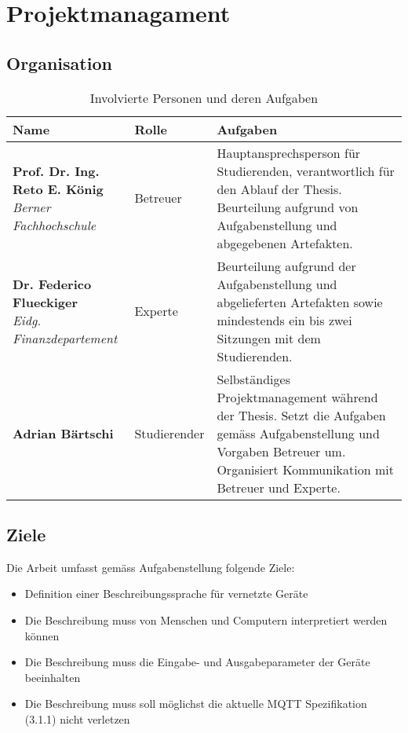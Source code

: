 \chapter{Projektmanagament}
\label{chap:projectmanagement}

\section{Organisation}

\begin{table}[H]
\begin{tabularx}{\textwidth}{|l|l|X|}

 \hline \rowcolor{lightgray}
 {\bf Name } & {\bf Rolle } & {\bf Aufgaben} \\  \hline
  \parbox[t]{5cm}{\textbf{Prof. Dr. Ing. Reto E. König} \\ \textit{Berner Fachhochschule}}  &   Betreuer  &
  Hauptansprechsperson für Studierenden, verantwortlich für den Ablauf der Thesis. Beurteilung aufgrund von Aufgabenstellung und abgegebenen Artefakten.   \\
 \hline
  \parbox[t]{5cm}{\textbf{Dr. Federico Flueckiger} \\ \textit{Eidg.  Finanzdepartement}} &   Experte     &
  Beurteilung aufgrund der Aufgabenstellung und abgelieferten Artefakten sowie mindestends ein bis zwei Sitzungen mit dem Studierenden. \\ 
\hline
 \textbf{Adrian Bärtschi}                &   Studierender   &     
 Selbständiges Projektmanagement während der Thesis. Setzt die Aufgaben gemäss Aufgabenstellung und Vorgaben Betreuer um. Organisiert Kommunikation mit Betreuer und Experte.   \\
 \hline


\end{tabularx}
\caption{Involvierte Personen und deren Aufgaben}
\end{table}


\section{Ziele}
Die Arbeit umfasst gemäss Aufgabenstellung folgende Ziele:
\begin{itemize}
    \item Definition einer Beschreibungssprache für vernetzte Geräte
    \item Die Beschreibung muss von Menschen und Computern interpretiert werden können
    \item Die Beschreibung muss die Eingabe- und Ausgabeparameter der Geräte beeinhalten
    \item Die Beschreibung muss soll möglichst die aktuelle MQTT Spezifikation (3.1.1) nicht verletzen
\end{itemize}

